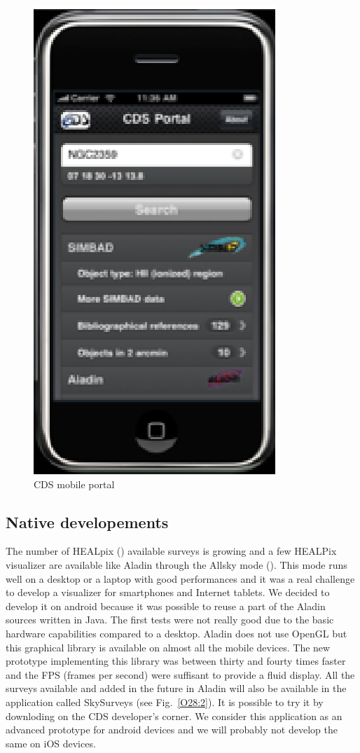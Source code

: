\documentclass[11pt,twoside]{article}
\begin{document}
\begin{figure}[h] \center
\includegraphics[scale=0.7]{O28_f4.eps}
\caption{CDS mobile portal} 
\label{O28:1}
\end{figure}

\subsection{Native developements}
The number of HEALpix (\citep{gorski_2005}) available surveys is growing and a few HEALPix visualizer are available like Aladin through the Allsky mode (\citep{fernique_2010}). This mode runs well on a desktop or a laptop with good performances and it was a real challenge to develop a visualizer for smartphones and Internet tablets. We decided to develop it on android because it was possible to reuse a part of the Aladin sources written in Java. The first tests were not really good due to the basic hardware capabilities compared to a desktop. Aladin does not use OpenGL but this graphical library is available on almost all the mobile devices. The new prototype implementing this library was between thirty and fourty times faster and the FPS (frames per second) were suffisant to provide a fluid display.
All the surveys available and added in the future in Aladin will also be available in the application called SkySurveys (see Fig.~\ref{O28:2}). It is possible to try it by downloding on the CDS developer's corner. 
We consider this application as an advanced prototype for android devices and we will probably not develop the same on iOS devices.
\end{document}
